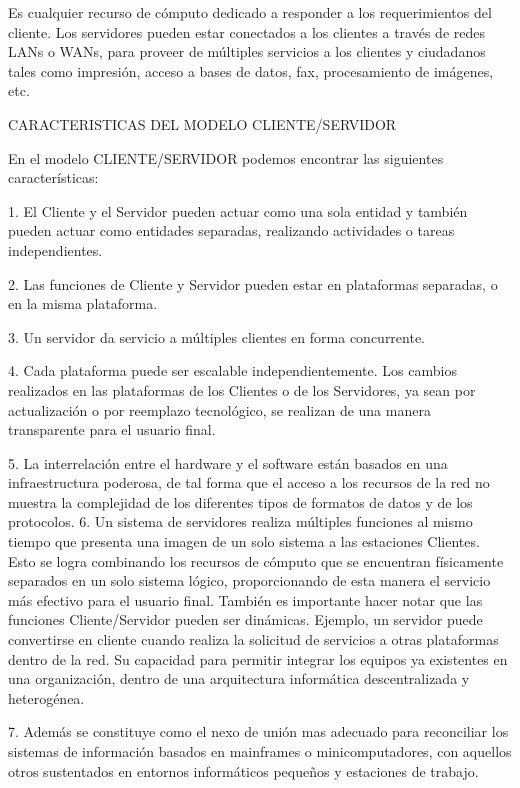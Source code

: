 Es cualquier recurso de cómputo dedicado a responder a los requerimientos del cliente. Los servidores pueden estar conectados a 
los clientes a través de redes LANs o WANs, para proveer de múltiples servicios a los clientes y ciudadanos tales como impresión, 
acceso a bases de datos, fax, procesamiento de imágenes, etc.

CARACTERISTICAS DEL MODELO CLIENTE/SERVIDOR

En el modelo CLIENTE/SERVIDOR podemos encontrar las siguientes características:

1. El Cliente y el Servidor pueden actuar como una sola entidad y también pueden actuar como entidades separadas, realizando 
actividades o tareas independientes.

2. Las funciones de Cliente y Servidor pueden estar en plataformas separadas, o en la misma plataforma.

3. Un servidor da servicio a múltiples clientes en forma concurrente.

4. Cada plataforma puede ser escalable independientemente. Los cambios realizados en las plataformas de los Clientes o de 
los Servidores, ya sean por actualización o por reemplazo tecnológico, se realizan de una manera transparente para el usuario final.

5. La interrelación entre el hardware y el software están basados en una infraestructura poderosa, de tal forma que el acceso a
los recursos de la red no muestra la complejidad de los diferentes tipos de formatos de datos y de los protocolos.
6. Un sistema de servidores realiza múltiples funciones al mismo tiempo que presenta una imagen de un solo sistema a las estaciones 
Clientes. Esto se logra combinando los recursos de cómputo que se encuentran físicamente separados en un solo sistema lógico, 
proporcionando de esta manera el servicio más efectivo para el usuario final.
También es importante hacer notar que las funciones Cliente/Servidor pueden ser dinámicas. Ejemplo, un servidor puede convertirse en 
cliente cuando realiza la solicitud de servicios a otras plataformas dentro de la red.
Su capacidad para permitir integrar los equipos ya existentes en una organización, dentro de una arquitectura informática 
descentralizada y heterogénea.

7. Además se constituye como el nexo de unión mas adecuado para reconciliar los sistemas de información basados en mainframes 
o minicomputadores, con aquellos otros sustentados en entornos informáticos pequeños y estaciones de trabajo.

